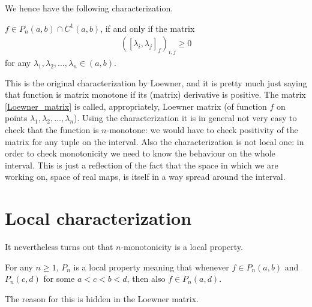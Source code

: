 We hence have the following characterization.

\begin{lause}\label{loewner_char}
	$f \in P_{n}(a, b) \cap C^{1}(a, b)$, if and only if the matrix
	\begin{align}\label{Loewner_matrix}
		\left([\lambda_{i}, \lambda_{j}]_{f}\right)_{i, j} \geq 0
	\end{align}
	for any $\lambda_{1}, \lambda_{2}, \ldots, \lambda_{n} \in (a, b)$.
\end{lause}

This is the original characterization by Loewner, and it is pretty much just saying that function is matrix monotone if its (matrix) derivative is positive. The matrix \ref{Loewner_matrix} is called, appropriately, Loewner matrix (of function $f$ on points $\lambda_{1}, \lambda_{2}, \ldots, \lambda_{n}$). Using the characterization it is in general not very easy to check that the function is $n$-monotone: we would have to check positivity of the matrix for any tuple on the interval. Also the characterization is not local one: in order to check monotonicity we need to know the behaviour on the whole interval. This is just a reflection of the fact that the space in which we are working on, space of real maps, is itself in a way spread around the interval.

\section{Local characterization}

It nevertheless turns out that $n$-monotonicity is a local property.

\begin{prop}
	For any $n \geq 1$, $P_{n}$ is a local property meaning that whenever $f \in P_{n}(a, b)$ and $P_{n}(c, d)$ for some $a < c < b < d$, then also $f \in P_{n}(a, d)$.
\end{prop}

The reason for this is hidden in the Loewner matrix.

